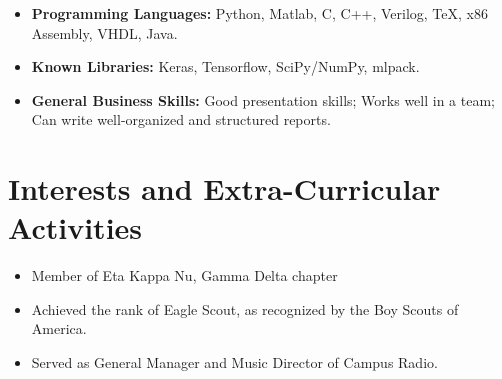 \documentclass[11pt,a4paper,sans]{moderncv}        %
\begin{document}
\vspace{3pt}

\begin{itemize}[label={}]

\item \textbf{Programming Languages: }Python, Matlab, C, C++, Verilog, TeX, x86 Assembly, VHDL, Java.
\vspace{1.5pt}
\item \textbf{Known Libraries: }Keras, Tensorflow, SciPy/NumPy, mlpack.
\vspace{1.5pt}
\item \textbf{General Business Skills:} Good presentation skills; Works well in a team; Can write well-organized and structured reports.

\end{itemize}

\section{Interests and Extra-Curricular Activities}


\begin{itemize}

\item{Member of Eta Kappa Nu, Gamma Delta chapter}
\item{Achieved the rank of Eagle Scout, as recognized by the Boy Scouts of America.}
\item{Served as General Manager and Music Director of Campus Radio.}

\end{itemize}

%


\end{document}
